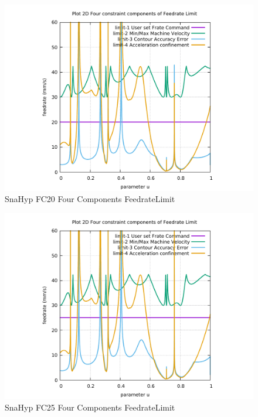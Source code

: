 \begin{figure}
	\caption     {SnaHyp FC20 Four Components FeedrateLimit}
	\label{32-img-SnaHyp-FC20-Four-Components-FeedrateLimit.pdf}
\includegraphics[width=1.00\textwidth]{Chap4/appendix/app-SnaHyp/plots/32-img-SnaHyp-FC20-Four-Components-FeedrateLimit.pdf}
\end{figure}


\clearpage
\pagebreak

\begin{figure}
	\caption     {SnaHyp FC25 Four Components FeedrateLimit}
	\label{33-img-SnaHyp-FC25-Four-Components-FeedrateLimit.pdf}
\includegraphics[width=1.00\textwidth]{Chap4/appendix/app-SnaHyp/plots/33-img-SnaHyp-FC30-Four-Components-FeedrateLimit.pdf}
\end{figure}


